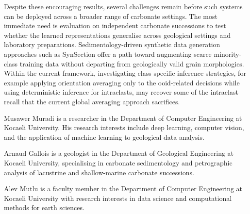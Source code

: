 \documentclass[a4paper,fleqn]{cas-dc}
\begin{document}
Despite these encouraging results, several challenges remain before such systems can be deployed across a broader range of carbonate settings. The most immediate need is evaluation on independent carbonate successions to test whether the learned representations generalise across geological settings and laboratory preparations. Sedimentology-driven synthetic data generation approaches such as SynSection \citep{ransinangue2025synsection} offer a path toward augmenting scarce minority-class training data without departing from geologically valid grain morphologies. Within the current framework, investigating class-specific inference strategies, for example applying orientation averaging only to the ooid-related decisions while using deterministic inference for intraclasts, may recover some of the intraclast recall that the current global averaging approach sacrifices.

\printcredits




\bio{}
Musawer Muradi is a researcher in the Department of Computer Engineering at Kocaeli University. His research interests include deep learning, computer vision, and the application of machine learning to geological data analysis.
\endbio

\bio{}
Arnaud Gallois is a geologist in the Department of Geological Engineering at Kocaeli University, specialising in carbonate sedimentology and petrographic analysis of lacustrine and shallow-marine carbonate successions.
\endbio

\bio{}
Alev Mutlu is a faculty member in the Department of Computer Engineering at Kocaeli University with research interests in data science and computational methods for earth sciences.
\endbio
\end{document}
